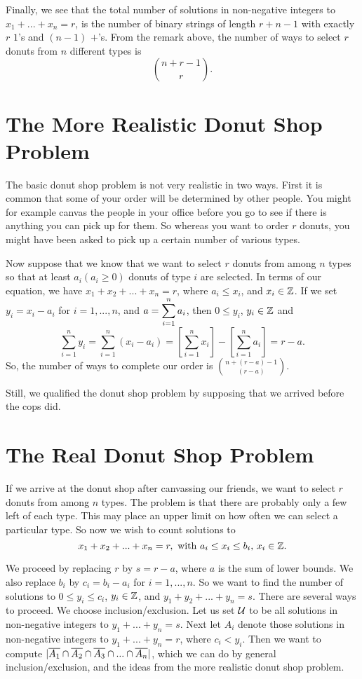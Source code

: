 Finally, we see that
 the total number of solutions in non-negative integers to 
$x_1+...+x_n=r$, is the number of binary strings of length $r+n-1$ with exactly $r$ $1$'s and
$(n-1)$ $+$'s.
From the remark above, the number of ways to select $r$ donuts from $n$ different types
 is 
\[
 \binom{n+r-1}{r}.
\]


\section{The More Realistic Donut Shop Problem} \label{sect:more realistic donut shop problem}
The basic donut shop problem is not very realistic in two ways. First it is common that some of your order
will be determined by other people. You might for example canvas the people in your office before
you go to see if there is anything you can pick up for them. So whereas you want to order $r$ donuts,
you might have been asked to pick up a certain number of various types.

Now suppose that we know that we want to select
$r$ donuts from among $n$ types so that at least $a_i(a_i\geq 0)$ donuts of type $i$ are selected.
In terms of our equation, we have $x_1+x_2+...+x_n=r$, where $a_i\leq x_i$, and $x_i\in \mathbb{Z}$.
If we set $y_i=x_i-a_i$ for $i=1,...,n$, and $\displaystyle{a=\sum_{i=1}^n a_i}$, then $0\leq y_i$, $y_i\in \mathbb{Z}$ and 
\[
\sum_{i=1}^n y_i =\sum_{i=1}^n (x_i-a_i)=\left[\sum_{i=1}^n x_i\right]-\left[\sum_{i=1}^n a_i\right]=r-a.
\]
So, the number of ways to complete our order is $\displaystyle{\binom{n+(r-a)-1}{(r-a)}}$.


Still, we qualified the donut shop problem by supposing that we arrived before the cops did.


\section{The Real Donut Shop Problem}\label{sect:real donut shop problem}
 If we arrive at the donut shop after canvassing our friends,
we want to select $r$ donuts from among $n$ types. The problem is that there are probably only 
a few left of each type. This may place an upper limit on how often we can select a particular type.
So now we wish to count solutions to 
\[
 x_1+x_2+...+x_n=r, \text{ with $a_i\leq x_i\leq b_i$, $x_i \in \mathbb{Z}$.}
\]
 
We proceed by replacing $r$ by $s=r-a$, where $a$ is the sum of lower bounds. 
We also replace $b_i$ by $c_i=b_i-a_i$ for $i=1,..., n$. So we want to find the number of solutions
to $0\leq y_i\leq c_i$, $y_i\in \mathbb{Z}$, and $y_1+y_2+...+y_n=s$. There are several ways to proceed.
We choose inclusion/exclusion. Let us set ${\cal {U}}$ to be all solutions in non-negative integers to $y_1+...+y_n=s$.
Next let $A_i$ denote those solutions in non-negative integers to $y_1+...+y_n=r$, where $c_i<y_i$.
Then we want to compute $|\overline{A_1}\cap \overline{A_2}\cap \overline{A_3}\cap ...\cap \overline{A_n}|$, which we can do
by general inclusion/exclusion, and the ideas from the more realistic donut shop problem.

